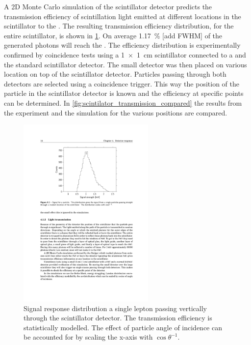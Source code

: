 A 2D Monte Carlo simulation of the scintillator detector predicts the transmission efficiency of scintillation light emitted at different locations in the scintillator to the \pmt \cite{steijger2010mc}. The resulting transmission efficiency distribution, for the entire scintillator, is shown in \cref{fig:signal_response}. On average \SI{1.17}{\percent} [add FWHM] of the generated photons will reach the \pmt. The efficiency distribution is experimentally confirmed by coincidence tests using a \SI[product-units = repeat]{1 x 1}{\centi\meter} scintillator connected to a \pmt and the standard scintillator detector. The small detector was then placed on various location on top of the scintillator detector. Particles passing through both detectors are selected using a coincidence trigger. This way the position of the particle in the scintillator detector is known and the efficiency at specific points can be determined. In \cref{fig:scintilator_transmission_compared} the results from the experiment and the simulation for the various positions are compared.

\begin{figure}
    \centering
    \includegraphics[width=0.6\textwidth]
                    {plots/station/signal_response}
    \caption{Signal response distribution a single lepton passing vertically through the scintillator detector. The transmission efficiency is statistically modelled. The effect of particle angle of incidence can be accounted for by scaling the x-axis with $\cos{\theta}^{-1}$.}
    \label{fig:signal_response}
\end{figure}

